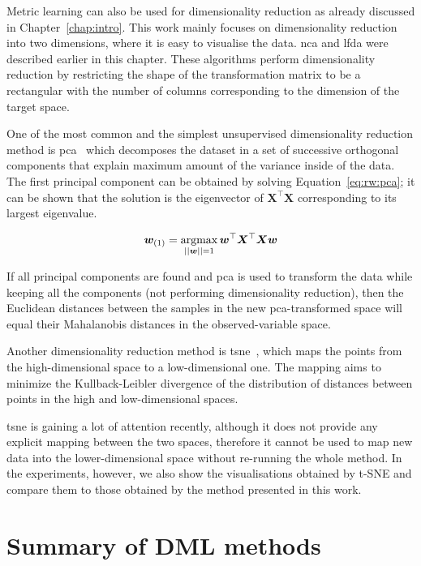 Metric learning can also be used for dimensionality reduction as already discussed in Chapter~\ref{chap:intro}. This work mainly focuses on dimensionality reduction into two dimensions, where it is easy to visualise the data. \Ac{nca} and \ac{lfda} were described earlier in this chapter. These algorithms perform dimensionality reduction by restricting the shape of the transformation matrix to be a rectangular with the number of columns corresponding to the dimension of the target space.

One of the most common and the simplest unsupervised dimensionality reduction method is \ac{pca}~\citep{jolliffe2002principal} which decomposes the dataset in a set of successive orthogonal components that explain maximum amount of the variance inside of the data. The first principal component can be obtained by solving Equation~\ref{eq:rw:pca}; it can be shown that the solution is the eigenvector of $\bm{X}^\top\bm{X}$ corresponding to its largest eigenvalue.

\begin{equation} 
\bm{w}_{(1)} = \operatorname*{argmax}_{||\bm{w}||=1} \bm{w}^\top\bm{X}^\top\bm{X}\bm{w} \label{eq:rw:pca}
\end{equation}

If all principal components are found and \ac{pca} is used to transform the data while keeping all the components (not performing dimensionality reduction), then the Euclidean distances between the samples in the new \ac{pca}-transformed space will equal their Mahalanobis distances in the observed-variable space.

Another dimensionality reduction method is \ac{tsne}~\citep{maaten2008visualizing}, which maps the points from the high-dimensional space to a low-dimensional one. The mapping aims to minimize the Kullback-Leibler divergence of the distribution of distances between points in the high and low-dimensional spaces.

\ac{tsne} is gaining a lot of attention recently, although it does not provide any explicit mapping between the two spaces, therefore it cannot be used to map new data into the lower-dimensional space without re-running the whole method. In the experiments, however, we also show the visualisations obtained by t-SNE and compare them to those obtained by the method presented in this work.

\newpage

\section{Summary of DML methods}

